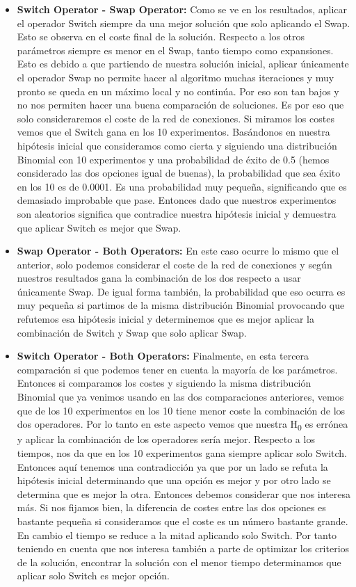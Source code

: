 \documentclass{article}
\begin{document}
\begin{enumerate}
  \begin{itemize}
    \item \textbf{Switch Operator - Swap Operator:} Como se ve en los resultados, aplicar el operador Switch siempre da una mejor solución que solo aplicando el Swap. Esto se observa en el coste final de la solución. Respecto a los otros parámetros siempre es menor en el Swap, tanto tiempo como expansiones. Esto es debido a que partiendo de nuestra solución inicial, aplicar únicamente el operador Swap no permite hacer al algoritmo muchas iteraciones y muy pronto se queda en un máximo local y no continúa. Por eso son tan bajos y no nos permiten hacer una buena comparación de soluciones. Es por eso que solo consideraremos el coste de la red de conexiones. Si miramos los costes vemos que el Switch gana en los 10 experimentos. Basándonos en nuestra hipótesis inicial que consideramos como cierta y siguiendo una distribución Binomial con 10 experimentos y una probabilidad de éxito de 0.5 (hemos considerado las dos opciones igual de buenas), la probabilidad que sea éxito en los 10 es de 0.0001. Es una probabilidad muy pequeña, significando que es demasiado improbable que pase. Entonces dado que nuestros experimentos son aleatorios significa que contradice nuestra hipótesis inicial y demuestra que aplicar Switch es mejor que Swap.
    \item \textbf{Swap Operator - Both Operators:} En este caso ocurre lo mismo que el anterior, solo podemos considerar el coste de la red de conexiones y según nuestros resultados gana la combinación de los dos respecto a usar únicamente Swap. De igual forma también, la probabilidad que eso ocurra es muy pequeña si partimos de la misma distribución Binomial provocando que refutemos esa hipótesis inicial y determinemos que es mejor aplicar la combinación de Switch y Swap que solo aplicar Swap.
    \item \textbf{Switch Operator - Both Operators:} Finalmente, en esta tercera comparación si que podemos tener en cuenta la mayoría de los parámetros. Entonces si comparamos los costes y siguiendo la misma distribución Binomial que ya venimos usando en las dos comparaciones anteriores, vemos que de los 10 experimentos en los 10 tiene menor coste la combinación de los dos operadores. Por lo tanto en este aspecto vemos que  nuestra H\textsubscript{0} es errónea y aplicar la combinación de los operadores sería mejor. Respecto a los tiempos, nos da que en los 10 experimentos gana siempre aplicar solo Switch. Entonces aquí tenemos una contradicción ya que por un lado se refuta la hipótesis inicial determinando que una opción es mejor y por otro lado se determina que es mejor la otra. Entonces debemos considerar que nos interesa más. Si nos fijamos bien, la diferencia de costes entre las dos opciones es bastante pequeña si consideramos que el coste es un número bastante grande. En cambio el tiempo se reduce a la mitad aplicando solo Switch. Por tanto teniendo en cuenta que nos interesa también a parte de optimizar los criterios de la solución, encontrar la solución con el menor tiempo determinamos que aplicar solo Switch es mejor opción.
  \end{itemize}


\end{enumerate}
\end{document}
